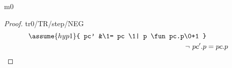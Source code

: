\documentclass[12pt]{amsart}
\begin{document}
\begin{machine}{m0}

\begin{proof}{tr0/TR/step/NEG}
\begin{align}
	\assume{hyp1}{ pc' &\1= pc \1| p \fun pc.p\0+1 } \\
	\goal{\neg ~ pc'.p  &= pc.p}
\end{align}
	\easy
\end{proof}


\end{machine}
\end{document}
